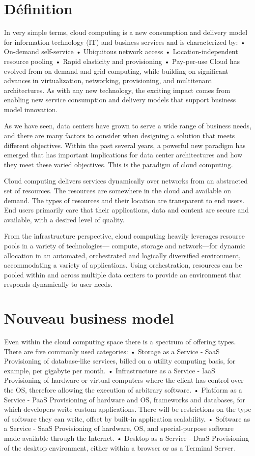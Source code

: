 \section{Définition}
In very simple terms, cloud computing is a new consumption and delivery model for information technology (IT) and business services and is characterized by:
 • On-demand self-service
 • Ubiquitous network access
 • Location-independent resource pooling
 • Rapid elasticity and provisioning
 • Pay-per-use
Cloud has evolved from on demand and grid computing, while building on significant advances in virtualization, networking, provisioning, and multitenant architectures. As with any new technology, the exciting impact comes from enabling new service consumption and delivery models that support business model innovation.

As we have seen, data centers have grown to serve a wide range of business needs, and there are many factors to consider when designing a solution that meets different objectives. Within the past several years, a powerful new paradigm has emerged that has important implications for data center architectures and how they meet these varied objectives. This is the paradigm of cloud computing.

Cloud computing delivers services dynamically over networks from an abstracted set of resources. The resources are somewhere in the cloud and available on demand. The types of resources and their location are transparent to end users. End users primarily care that their applications, data and content are secure and available, with a desired level of quality.


From the infrastructure perspective, cloud computing heavily leverages resource pools in a variety of technologies— compute, storage and network—for dynamic allocation in an automated, orchestrated and logically diversified environment, accommodating a variety of applications. Using orchestration, resources can be pooled within and across multiple data centers to provide an environment that responds dynamically to user needs.

\section{Nouveau business model}

Even within the cloud computing space there is a spectrum of offering types. There are five commonly used categories:
•  Storage as a Service - SaaS
Provisioning of database-like services, billed on a utility computing basis, for
example, per gigabyte per month.
•  Infrastructure as a Service - IaaS
Provisioning of hardware or virtual computers where the client has control over the OS, therefore allowing the execution of arbitrary software.
•  Platform as a Service - PaaS
Provisioning of hardware and OS, frameworks and databases, for which developers write custom applications. There will be restrictions on the type of software they can write, offset by built-in application scalability.
•  Software as a Service - SaaS
Provisioning of hardware, OS, and special-purpose software made available
through the Internet.
•  Desktop as a Service - DaaS
Provisioning of the desktop environment, either within a browser or as a Terminal Server.

